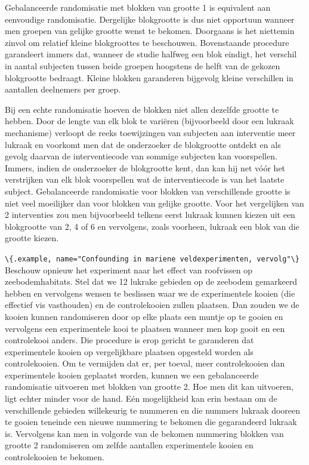 \documentclass[
  12pt,dutch,coursenotes]{book}
\newcommand{\passthrough}[1]{#1}
\begin{document}
Gebalanceerde randomisatie met blokken van grootte 1 is equivalent aan
eenvoudige randomisatie. Dergelijke blokgrootte is dus niet opportuun
wanneer men groepen van gelijke grootte wenst te bekomen.
Doorgaans is het niettemin zinvol om relatief kleine blokgroottes te
beschouwen. Bovenstaande procedure garandeert immers dat, wanneer de studie
halfweg een blok eindigt, het verschil in aantal subjecten tussen beide
groepen hoogstens de helft van de gekozen blokgrootte bedraagt.
Kleine blokken garanderen bijgevolg kleine verschillen in aantallen deelnemers per groep.

Bij een echte randomisatie hoeven de blokken niet allen dezelfde grootte te
hebben. Door de lengte van elk blok te variëren (bijvoorbeeld door een
lukraak mechanisme) verloopt de reeks toewijzingen van subjecten aan
interventie meer lukraak en voorkomt men dat de onderzoeker de blokgrootte ontdekt
en als gevolg daarvan de interventiecode van sommige subjecten kan
voorspellen. Immers, indien de onderzoeker de blokgrootte kent, dan kan hij net vóór het verstrijken van elk blok voorspellen wat de interventiecode
is van het laatste subject. Gebalanceerde randomisatie voor blokken
van verschillende grootte is niet veel moeilijker dan voor blokken van
gelijke grootte. Voor het vergelijken van 2 interventies zou men
bijvoorbeeld telkens eerst lukraak kunnen kiezen uit een blokgrootte van 2,
4 of 6 en vervolgens, zoals voorheen, lukraak een blok van die grootte
kiezen.

\passthrough{\lstinline!\{.example, name="Confounding in mariene veldexperimenten, vervolg"\}!}
Beschouw opnieuw het experiment naar het effect van roofvissen op zeebodemhabitats. Stel dat we 12 lukrake gebieden op de zeebodem gemarkeerd hebben en vervolgens wensen te beslissen waar we de experimentele kooien (die effectief vis vasthouden) en de controlekooien zullen plaatsen. Dan zouden we de kooien kunnen randomiseren door op elke plaats een muntje op te gooien en vervolgens een experimentele kooi te plaatsen wanneer men kop gooit en een controlekooi anders. Die procedure is erop gericht te garanderen dat experimentele kooien op vergelijkbare plaatsen opgesteld worden als controlekooien. Om te vermijden dat er, per toeval, meer controlekooien dan experimentele kooien geplaatst worden, kunnen we een gebalanceerde randomisatie uitvoeren met blokken van grootte 2. Hoe men dit kan uitvoeren, ligt echter minder voor de hand. Eén mogelijkheid kan erin bestaan om de verschillende gebieden willekeurig te nummeren en die nummers lukraak dooreen te gooien teneinde een nieuwe nummering te bekomen die gegarandeerd lukraak is. Vervolgens kan men in volgorde van de bekomen nummering blokken van grootte 2 randomiseren om zelfde aantallen experimentele kooien en controlekooien te bekomen.
\end{document}
